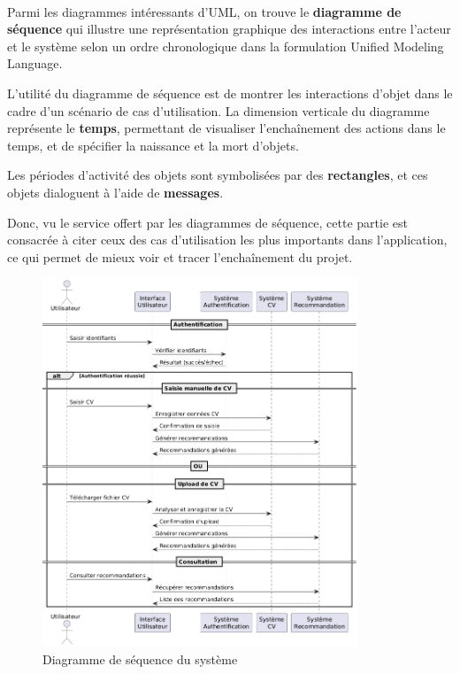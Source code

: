 \paragraph{}\begin{spacing}{1}
Parmi les diagrammes intéressants d’UML, on trouve le \textbf{diagramme de séquence} qui illustre une représentation graphique des interactions entre l’acteur et le système selon un ordre chronologique dans la formulation Unified Modeling Language.

L’utilité du diagramme de séquence est de montrer les interactions d’objet dans le cadre d’un scénario de cas d’utilisation. La dimension verticale du diagramme représente le \textbf{temps}, permettant de visualiser l'enchaînement des actions dans le temps, et de spécifier la naissance et la mort d'objets.

Les périodes d'activité des objets sont symbolisées par des \textbf{rectangles}, et ces objets dialoguent à l'aide de \textbf{messages}. 

Donc, vu le service offert par les diagrammes de séquence, cette partie est consacrée à citer ceux des cas d’utilisation les plus importants dans l’application, ce qui permet de mieux voir et tracer l’enchaînement du projet.
\end{spacing}
\begin{figure}
    \centering
    \includegraphics[width=\linewidth, height=11cm]{images/diagramme dequence.png}
    \caption{Diagramme de séquence du système} 
\end{figure}

